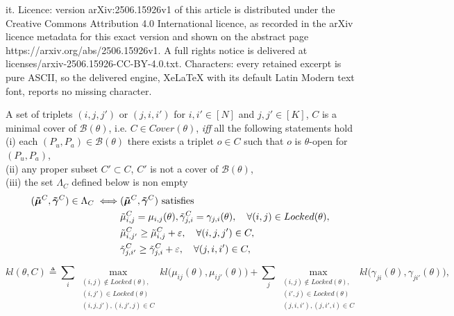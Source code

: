 \documentclass[10pt,a4paper]{amsart}
\begin{document}
it. Licence: version arXiv:2506.15926v1 of this article is distributed under the Creative Commons Attribution 4.0 International licence, as recorded in the arXiv licence metadata for this exact version and shown on the abstract page https://arxiv.org/abs/2506.15926v1. A full rights notice is delivered at licenses/arxiv-2506.15926-CC-BY-4.0.txt. Characters: every retained excerpt is pure ASCII, so the delivered engine, XeLaTeX with its default Latin Modern text font, reports no missing character.
\begin{definition} \label{def:cover}
A set of triplets $(i,j,j')$ or $(j,i,i')$ for $i,i'\in [N]$ and $j,j'\in [K]$, $C$ is a minimal cover of $\mathcal{B}(\theta)$, i.e. $C \in Cover(\theta)$, \emph{iff} all the following statements hold\\
(i) each $(P_u, P_a) \in \mathcal{B}(\theta)$ there exists a triplet $o \in C$ such that $o$ is  $\theta$-open for $(P_u, P_a)$, \\ 
(ii) any proper subset $C' \subset C$, $C'$ is not a cover of $\mathcal{B}(\theta)$,\\
(iii) the set $\Lambda_C$ defined below is non empty
\begin{align}
(\boldsymbol{\tilde{\mu}}^{C}, \boldsymbol{\tilde{\gamma}}^{C}) \in \Lambda_C   \iff &(\boldsymbol{\tilde{\mu}}^{C}, \boldsymbol{\tilde{\gamma}}^{C}) \text{ satisfies} \notag\\
&\tilde{\mu}_{i,j}^{C} =  \mu_{i,j}(\theta), \tilde{\gamma}_{j,i}^{C} =  \gamma_{j,i}(\theta), \quad\forall (i,j) \in Locked(\theta),  \label{eq:lower_4}\\
&\tilde{\mu}_{i,j'}^{C} \geq \tilde{\mu}_{i,j}^{C} + \varepsilon,  \quad\forall (i, j, j') \in C,  \label{eq:lower_5}\\
&\tilde{\gamma}_{j,i'}^{C} \geq \tilde{\gamma}_{j,i}^{C} + \varepsilon, \quad\forall (j, i, i') \in C, \label{eq:lower_6}
\end{align}
\end{definition} 

\begin{equation}\label{eq:kl_theta_c}
 kl(\theta, C) \triangleq\sum_{i}\max_{\substack{(i,j) \notin Locked(\theta),\\ (i,j')\in Locked(\theta)\\ (i,j,j'), (i,j',j) \in C}} kl\big( \mu_{ij}(\theta), \mu_{ij'}(\theta) \big) + \sum_{j}\max_{\substack{(i,j) \notin Locked(\theta),\\ (i',j)\in Locked(\theta)\\ (j,i,i'), (j,i',i) \in C}} kl\big(\gamma_{ji}(\theta), \gamma_{ji'}(\theta)\big),
\end{equation}
\end{document}
